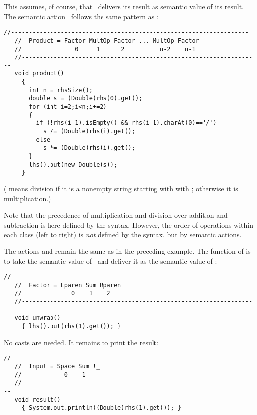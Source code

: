 This assumes, of course, that \Product\ delivers its result as semantic value
of its result.
The semantic action \Producta\ follows the same pattern as \Suma:

\small
\begin{Verbatim}[frame=single,framesep=2mm,samepage=true,xleftmargin=15mm,xrightmargin=15mm,baselinestretch=0.8]
   //-------------------------------------------------------------------
   //  Product = Factor MultOp Factor ... MultOp Factor 
   //               0     1      2          n-2    n-1
   //-------------------------------------------------------------------
   void product()
     {        
       int n = rhsSize();
       double s = (Double)rhs(0).get();
       for (int i=2;i<n;i+=2)
       {
         if (!rhs(i-1).isEmpty() && rhs(i-1).charAt(0)=='/')
           s /= (Double)rhs(i).get();
         else  
           s *= (Double)rhs(i).get();
       }  
       lhs().put(new Double(s));
     }
\end{Verbatim}
\normalsize

(
means division if it is a nonempty string starting with with ;
otherwise it is multiplication.)

Note that the precedence of multiplication and division 
over addition and subtraction is here defined by the syntax.
However, the order of operations within each class (left to right)
is \emph{not} defined by the syntax, but by semantic actions.

The actions  and  
remain the same as in the preceding example.
The function of  is to take the semantic value of \Sum\
and deliver it as the semantic value of \Factor:

\small
\begin{Verbatim}[frame=single,framesep=2mm,samepage=true,xleftmargin=15mm,xrightmargin=15mm,baselinestretch=0.8]
   //-------------------------------------------------------------------
   //  Factor = Lparen Sum Rparen 
   //              0    1    2
   //-------------------------------------------------------------------
   void unwrap()
     { lhs().put(rhs(1).get()); }
\end{Verbatim}
\normalsize

No casts are needed.
It remains to print the result:

\small
\begin{Verbatim}[frame=single,framesep=2mm,samepage=true,xleftmargin=15mm,xrightmargin=15mm,baselinestretch=0.8]
   //-------------------------------------------------------------------
   //  Input = Space Sum !_
   //            0    1
   //-------------------------------------------------------------------
   void result()
     { System.out.println((Double)rhs(1).get()); }
\end{Verbatim}
\normalsize

